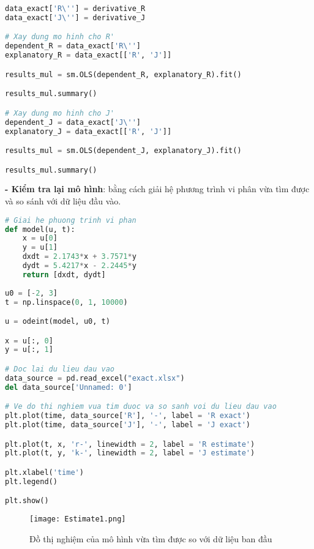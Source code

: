 \documentclass[a4paper]{article}
\begin{document}
\begin{lstlisting}[language=Python]
data_exact['R\''] = derivative_R
data_exact['J\''] = derivative_J

# Xay dung mo hinh cho R'
dependent_R = data_exact['R\'']
explanatory_R = data_exact[['R', 'J']]

results_mul = sm.OLS(dependent_R, explanatory_R).fit()

results_mul.summary()

# Xay dung mo hinh cho J'
dependent_J = data_exact['J\'']
explanatory_J = data_exact[['R', 'J']]

results_mul = sm.OLS(dependent_J, explanatory_J).fit()

results_mul.summary()
\end{lstlisting}

    {\bfseries - Kiểm tra lại mô hình}: bằng cách giải hệ phương trình vi phân vừa tìm được và so sánh với dữ liệu đầu vào.\\
    
\begin{lstlisting}[language=Python]
# Giai he phuong trinh vi phan
def model(u, t):
    x = u[0]
    y = u[1]
    dxdt = 2.1743*x + 3.7571*y
    dydt = 5.4217*x - 2.2445*y
    return [dxdt, dydt]
 
u0 = [-2, 3]
t = np.linspace(0, 1, 10000)

u = odeint(model, u0, t)

x = u[:, 0]
y = u[:, 1]

# Doc lai du lieu dau vao
data_source = pd.read_excel("exact.xlsx")
del data_source['Unnamed: 0']

# Ve do thi nghiem vua tim duoc va so sanh voi du lieu dau vao
plt.plot(time, data_source['R'], '-', label = 'R exact')
plt.plot(time, data_source['J'], '-', label = 'J exact')

plt.plot(t, x, 'r-', linewidth = 2, label = 'R estimate')
plt.plot(t, y, 'k-', linewidth = 2, label = 'J estimate')

plt.xlabel('time')
plt.legend()

plt.show()
\end{lstlisting}

    \begin{figure}[!htp]
        \centering
        \texttt{[image: Estimate1.png]}
        \caption{Đồ thị nghiệm của mô hình vừa tìm được so với dữ liệu ban đầu} 
    \end{figure}
\end{document}

